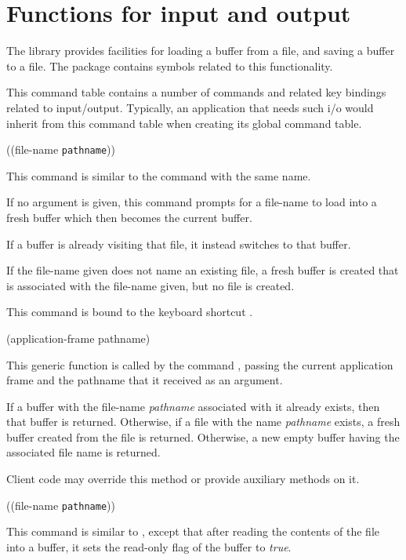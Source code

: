 \chapter{Functions for input and output}

The \sysname{} library provides facilities for loading a buffer from a
file, and saving a buffer to a file.  The  package
contains symbols related to this functionality.


This command table contains a number of commands and related key
bindings related to input/output.  Typically, an application that
needs such i/o would inherit from this command table when creating its
global command table.

 {((file-name \texttt{pathname}))}

This command is similar to the \emacs{} command with the same name.

If no argument is given, this command prompts for a file-name to load
into a fresh buffer which then becomes the current buffer.

If a buffer is already visiting that file, it instead switches to that
buffer.

If the file-name given does not name an existing file, a fresh buffer
is created that is associated with the file-name given, but no file is
created.

This command is bound to the keyboard shortcut .

 {(application-frame pathname)}

This generic function is called by the command
, passing the current application frame and the
pathname that it received as an argument.

If a buffer with the file-name \textit{pathname} associated with it
already exists, then that buffer is returned.  Otherwise, if a file
with the name \textit{pathname} exists, a fresh buffer created from
the file is returned.  Otherwise, a new empty buffer having the
associated file name is returned.

Client code may override this method or provide auxiliary methods on
it.

 {((file-name \texttt{pathname}))}

This command is similar to , except that after
reading the contents of the file into a buffer, it sets the read-only
flag of the buffer to \emph{true}.


